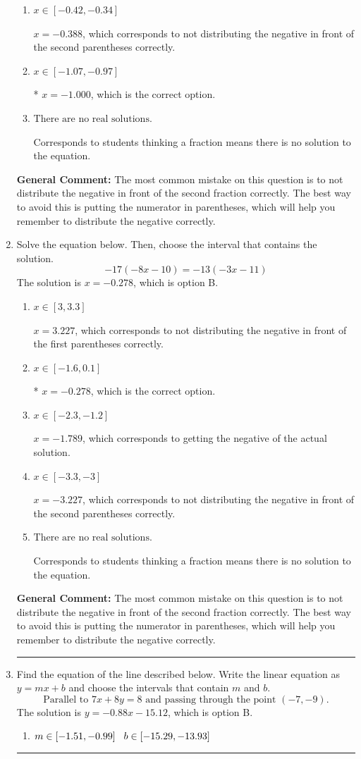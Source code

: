 \documentclass{extbook}[14pt]
\newcommand{\litem}[1]{\item #1

\rule{\textwidth}{0.4pt}}
\begin{document}
\begin{enumerate}
{\begin{enumerate}[label=\Alph*.]
$x = 0.463$, which corresponds to getting the negative of the actual solution.
\item \( x \in [-0.42, -0.34] \)

$x = -0.388$, which corresponds to not distributing the negative in front of the second parentheses correctly.
\item \( x \in [-1.07, -0.97] \)

* $x = -1.000$, which is the correct option.
\item \( \text{There are no real solutions.} \)

Corresponds to students thinking a fraction means there is no solution to the equation.
\end{enumerate}

\textbf{General Comment:} The most common mistake on this question is to not distribute the negative in front of the second fraction correctly. The best way to avoid this is putting the numerator in parentheses, which will help you remember to distribute the negative correctly.
}
\litem{
Solve the equation below. Then, choose the interval that contains the solution.
\[ -17(-8x -10) = -13(-3x -11) \]The solution is \( x = -0.278 \), which is option B.\begin{enumerate}[label=\Alph*.]
\item \( x \in [3, 3.3] \)

$x = 3.227$, which corresponds to not distributing the negative in front of the first parentheses correctly.
\item \( x \in [-1.6, 0.1] \)

* $x = -0.278$, which is the correct option.
\item \( x \in [-2.3, -1.2] \)

$x = -1.789$, which corresponds to getting the negative of the actual solution.
\item \( x \in [-3.3, -3] \)

$x = -3.227$, which corresponds to not distributing the negative in front of the second parentheses correctly.
\item \( \text{There are no real solutions.} \)

Corresponds to students thinking a fraction means there is no solution to the equation.
\end{enumerate}

\textbf{General Comment:} The most common mistake on this question is to not distribute the negative in front of the second fraction correctly. The best way to avoid this is putting the numerator in parentheses, which will help you remember to distribute the negative correctly.
}
\litem{
Find the equation of the line described below. Write the linear equation as $ y=mx+b $ and choose the intervals that contain $m$ and $b$.
\[ \text{Parallel to } 7 x + 8 y = 8 \text{ and passing through the point } (-7, -9). \]The solution is \( y = -0.88x - 15.12 \), which is option B.\begin{enumerate}[label=\Alph*.]
\item \( m \in [-1.51, -0.99] \hspace*{3mm} b \in [-15.29, -13.93] \)


\end{enumerate}}
\end{enumerate}
\end{document}
